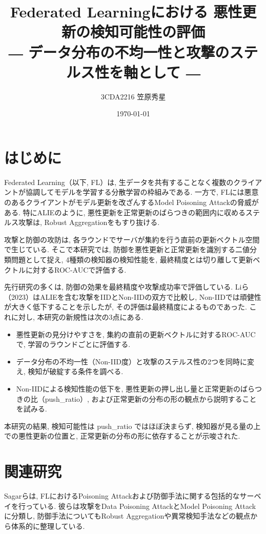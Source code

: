 \documentclass[a4j, dvipdfmx]{jsarticle}
\title{
Federated Learningにおける
悪性更新の検知可能性の評価\\[0.8em]
\large
― データ分布の不均一性と攻撃のステルス性を軸として ―
}
\author{3CDA2216 笠原秀星}
\date{\today}
\newcommand{\PushRatio}{\textrm{push\_ratio}}
\begin{document}
\maketitle

\section{はじめに}

Federated Learning（以下, FL）は, 生データを共有することなく複数のクライアントが協調してモデルを学習する分散学習の枠組みである\cite{mammen2021fl}. 一方で, FLには悪意のあるクライアントがモデル更新を改ざんするModel Poisoning Attackの脅威がある\cite{sagar2023survey}. 特にALIE\cite{baruch2019little}のように, 悪性更新を正常更新のばらつきの範囲内に収めるステルス攻撃は, Robust Aggregationをもすり抜ける.

攻撃と防御の攻防は, 各ラウンドでサーバが集約を行う直前の更新ベクトル空間で生じている. そこで本研究では, 防御を悪性更新と正常更新を識別する二値分類問題として捉え, 4種類の検知器の検知性能を, 最終精度とは切り離して更新ベクトルに対するROC-AUCで評価する.

先行研究の多くは, 防御の効果を最終精度や攻撃成功率で評価している. Liら（2023）\cite{li2023experimental}はALIEを含む攻撃をIIDとNon-IIDの双方で比較し, Non-IIDでは頑健性が大きく低下することを示したが, その評価は最終精度によるものであった. これに対し, 本研究の新規性は次の3点にある.
\begin{itemize}
  \item 悪性更新の見分けやすさを, 集約の直前の更新ベクトルに対するROC-AUCで, 学習のラウンドごとに評価する.
  \item データ分布の不均一性（Non-IID度）と攻撃のステルス性の2つを同時に変え, 検知が破綻する条件を調べる.
  \item Non-IIDによる検知性能の低下を, 悪性更新の押し出し量と正常更新のばらつきの比（push\_ratio）, および正常更新の分布の形の観点から説明することを試みる.
\end{itemize}

本研究の結果, 検知可能性は \PushRatio{} ではほぼ決まらず, 検知器が見る量の上での悪性更新の位置と, 正常更新の分布の形に依存することが示唆された.

\section{関連研究}

Sagarらは, FLにおけるPoisoning Attackおよび防御手法に関する包括的なサーベイを行っている. 彼らは攻撃をData Poisoning AttackとModel Poisoning Attackに分類し, 防御手法についてもRobust Aggregationや異常検知手法などの観点から体系的に整理している\cite{sagar2023survey}.
\end{document}
